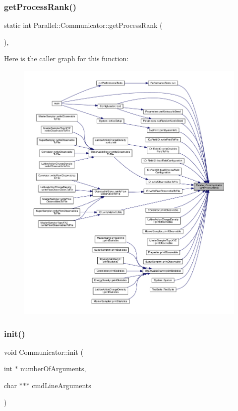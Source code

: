 \subsubsection{\texorpdfstring{getProcessRank()}{getProcessRank()}}
{\footnotesize\ttfamily static int Parallel\+::\+Communicator\+::get\+Process\+Rank (\begin{DoxyParamCaption}{ }\end{DoxyParamCaption})\hspace{0.3cm}{\ttfamily [inline]}, {\ttfamily [static]}}

Here is the caller graph for this function\+:
\nopagebreak
\begin{figure}[H]
\begin{center}
\leavevmode
\includegraphics[width=350pt]{class_parallel_1_1_communicator_a474ab433da0e83ef372d74e26a7e5cb0_icgraph}
\end{center}
\end{figure}
\mbox{\label{class_parallel_1_1_communicator_a4ed2a77c33cd899b31131e44fc906fd7}} 
\subsubsection{\texorpdfstring{init()}{init()}}
{\footnotesize\ttfamily void Communicator\+::init (\begin{DoxyParamCaption}\item[{int $\ast$}]{number\+Of\+Arguments,  }\item[{char $\ast$$\ast$$\ast$}]{cmd\+Line\+Arguments }\end{DoxyParamCaption})\hspace{0.3cm}{\ttfamily [static]}}



